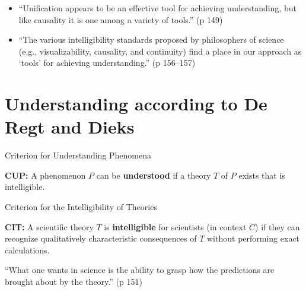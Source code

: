 \documentclass[fleqn]{beamer}
\begin{document}
\begin{frame}

  \begin{itemize}
  \item ``Unification appears to be an effective tool for achieving
    understanding, but like causality it is one among a variety of
    tools.'' (p 149)
  \item ``The various intelligibility standards proposed by
    philosophers of science (e.g., visualizability, causality, and
    continuity) find a place in our approach as `tools' for achieving
    understanding.'' (p 156--157)
  \end{itemize}

\end{frame}

\section{Understanding according to De Regt and Dieks}

\begin{frame}{Criterion for Understanding Phenomena}

  \textbf{CUP:} A phenomenon $P$ can be \textbf{understood} if a
  theory $T$ of $P$ exists that is intelligible.

\end{frame}

\begin{frame}{Criterion for the Intelligibility of Theories}

  \textbf{CIT:} A scientific theory $T$ is \textbf{intelligible} for
  scientists (in context $C$) if they can recognize qualitatively
  characteristic consequences of $T$ without performing exact
  calculations.

  \vspace{2em}
  ``What one wants in science is the ability to grasp how the
  predictions are brought about by the theory.'' (p 151)

\end{frame}
\end{document}
